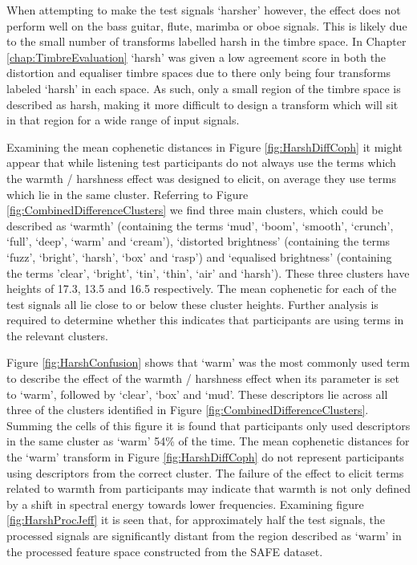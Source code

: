 			When attempting to make the test signals `harsher' however, the effect does not perform well on the
			bass guitar, flute, marimba or oboe signals. This is likely due to the small number of transforms
			labelled harsh in the timbre space. In Chapter \ref{chap:TimbreEvaluation} `harsh' was given a low
			agreement score in both the distortion and equaliser timbre spaces due to there only being four
			transforms labeled `harsh' in each space. As such, only a small region of the timbre space is
			described as harsh, making it more difficult to design a transform which will sit in that region
			for a wide range of input signals.
			
			Examining the mean cophenetic distances in Figure \ref{fig:HarshDiffCoph} it might appear that
			while listening test participants do not always use the terms which the warmth / harshness effect
			was designed to elicit, on average they use terms which lie in the same cluster. Referring to
			Figure \ref{fig:CombinedDifferenceClusters} we find three main clusters, which could be described
			as `warmth' (containing the terms `mud', `boom', `smooth', `crunch', `full', `deep', `warm' and
			`cream'), `distorted brightness' (containing the terms `fuzz', `bright', `harsh', `box' and `rasp')
			and `equalised brightness' (containing the terms 'clear', `bright', `tin', `thin', `air' and
			`harsh'). These three clusters have heights of 17.3, 13.5 and 16.5 respectively. The mean
			cophenetic for each of the test signals all lie close to or below these cluster heights. Further
			analysis is required to determine whether this indicates that participants are using terms in the
			relevant clusters.

			Figure \ref{fig:HarshConfusion} shows that `warm' was the most commonly used term to describe the
			effect of the warmth / harshness effect when its parameter is set to `warm', followed by `clear',
			`box' and `mud'. These descriptors lie across all three of the clusters identified in Figure
			\ref{fig:CombinedDifferenceClusters}. Summing the cells of this figure it is found that
			participants only used descriptors in the same cluster as `warm' 54\% of the time. The mean
			cophenetic distances for the `warm' transform in Figure \ref{fig:HarshDiffCoph} do not represent
			participants using descriptors from the correct cluster. The failure of the effect to elicit terms
			related to warmth from participants may indicate that warmth is not only defined by a shift in
			spectral energy towards lower frequencies. Examining figure \ref{fig:HarshProcJeff} it is seen
			that, for approximately half the test signals, the processed signals are significantly distant from
			the region described as `warm' in the processed feature space constructed from the SAFE dataset.
			
